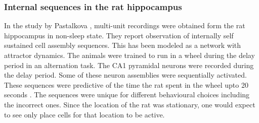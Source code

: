 \subsubsection{Internal sequences in the rat hippocampus}
In the study by Pastalkova \cite{Pastalkova2008a}, multi-unit recordings were obtained form the rat hippocampus in non-sleep state. They report observation of internally self sustained cell assembly sequences. This has been modeled as a network with attractor dynamics. The animals were trained to run in a wheel during the delay period in an alternation task. The CA1 pyramidal neurons were recorded during the delay period. Some of these neuron assemblies were sequentially activated. These sequences were predictive of the time the rat spent in the wheel upto 20 seconds \cite{Itskov2011a}. The sequences were unique for different behavioural choices including the incorrect ones. Since the location of the rat was stationary, one would expect to see only place cells for that location to be active.  \\  
